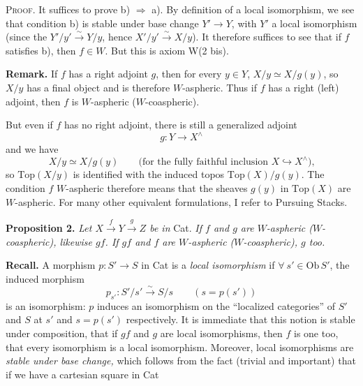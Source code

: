 \documentclass[11pt,leqno]{article}
\newcommand{\printedpage}[1]{\marginpar{\footnotesize p.~#1}}
\newcommand{\msp}[1]{\marginpar{\footnotesize [#1]}}
\newcommand{\Ob}{\mathrm{Ob}\,}
\begin{document}
\textsc{Proof.} It suffices to prove b) $\Longrightarrow$ a). By definition of a local isomorphism, we see that condition b) is stable under base change $Y' \longrightarrow Y$, with $Y'$ a local isomorphism (since the $Y'/y' \xrightarrow{\sim} Y/y$, hence $X'/y' \xrightarrow{\sim} X/y$). It therefore suffices to see that if $f$ satisfies b), then $f \in W$. But this is axiom W(2 bis).

\begin{center}
\end{center}

\printedpage{20}

\textbf{Remark.} If $f$ has a right adjoint $g$, then for every $y \in Y$, $X/y \simeq X/g(y)$, so $X/y$ has a final object and is therefore $W$-aspheric. Thus if $f$ has a right (left) adjoint, then $f$ is $W$-aspheric ($W$-coaspheric).

But even if $f$ has no right adjoint, there is still a generalized adjoint
\[
g : Y \longrightarrow X^{\wedge}
\]
and we have
\[
X/y \simeq X/g(y) \qquad \text{(for the fully faithful inclusion $X \hookrightarrow X^{\wedge}$),}
\]
so $\mathrm{Top}(X/y)$ is identified with the induced topos $\mathrm{Top}(X)/g(y)$. The condition $f$ $W$-aspheric therefore means that the sheaves $g(y)$ in $\mathrm{Top}(X)$ are
\msp{page 24}
$W$-aspheric. For many other equivalent formulations, I refer to Pursuing Stacks.

\textbf{Proposition 2.} \textit{Let $X \xrightarrow{f} Y \xrightarrow{g} Z$ be in} \textup{Cat}. \textit{If $f$ and $g$ are $W$-aspheric ($W$-coaspheric), likewise $gf$. If $gf$ and $f$ are $W$-aspheric ($W$-coaspheric), $g$ too.}

\textbf{Recall.} A morphism $p : S' \longrightarrow S$ in Cat is a \textit{local isomorphism} if $\forall\ s' \in \Ob S'$, the induced morphism
\[
p_{s'} : S'/s' \xrightarrow{\sim} S/s \qquad (s = p(s'))
\]
is an isomorphism: $p$ induces an isomorphism on the ``localized categories'' of $S'$ and $S$ at $s'$ and $s = p(s')$ respectively. It is immediate that this notion is stable under composition, that if $gf$ and $g$ are local isomorphisms, then $f$ is one too, that every isomorphism is a local isomorphism. Moreover, local isomorphisms are \textit{stable under base change,} which follows from the fact (trivial and important) that if we have a cartesian square in Cat
\end{document}

